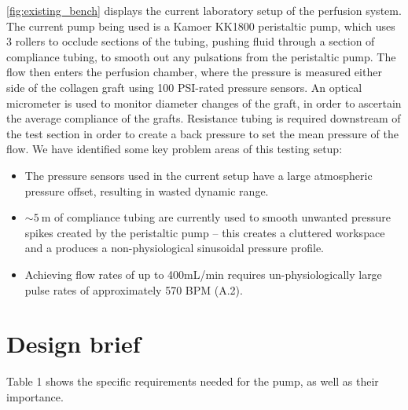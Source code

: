 \documentclass[10pt, a4paper]{article}
\begin{document}
\autoref{fig:existing_bench} displays the current laboratory setup of the perfusion system. The current pump being used is a Kamoer KK1800 peristaltic pump, which uses 3 rollers to occlude sections of the tubing, pushing fluid through a section of compliance tubing, to smooth out any pulsations from the peristaltic pump. The flow then enters the perfusion chamber, where the pressure is measured either side of the collagen graft using 100 PSI-rated pressure sensors. An optical micrometer is used to monitor diameter changes of the graft, in order to ascertain the average compliance of the grafts. Resistance tubing is required downstream of the test section in order to create a back pressure to set the mean pressure of the flow. We have identified some key problem areas of this testing setup:
\begin{itemize}[noitemsep]
    \item The pressure sensors used in the current setup have a large atmospheric pressure offset, resulting in wasted dynamic range.
    \item $\sim \SI{5}{\metre}$ of compliance tubing are currently used to smooth unwanted pressure spikes created by the peristaltic pump -- this creates a cluttered workspace and a produces a non-physiological sinusoidal pressure profile.
    \item Achieving flow rates of up to 400mL/min requires un-physiologically large pulse rates of approximately 570 BPM (A.2).
\end{itemize}

\section{Design brief}


Table 1 shows the specific requirements needed for the pump, as well as their importance.
\end{document}
